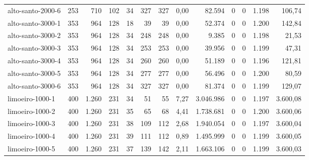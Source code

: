 \begin{table}[ht!]
{\begin{tabular}{lrrrrrrrrrrrr}
			\rowcolor{rowgrey}alto-santo-2000-6                                                       & 253   & 710   & 102 & 34 & 327 & 327 & 0,00  & 82.594    & 0 & 0 & 1.198 & 106,74   \\
			\rowcolor{rowgrey}alto-santo-3000-1                                                       & 353   & 964   & 128 & 18 & 39  & 39  & 0,00  & 52.374    & 0 & 0 & 1.200 & 142,84   \\
			\rowcolor{rowgrey}alto-santo-3000-2                                                       & 353   & 964   & 128 & 34 & 248 & 248 & 0,00  & 9.385     & 0 & 0 & 1.198 & 21,53    \\
			\rowcolor{rowgrey}alto-santo-3000-3                                                       & 353   & 964   & 128 & 34 & 253 & 253 & 0,00  & 39.956    & 0 & 0 & 1.199 & 47,31    \\
			\rowcolor{rowgrey}alto-santo-3000-4                                                       & 353   & 964   & 128 & 34 & 260 & 260 & 0,00  & 51.189    & 0 & 0 & 1.196 & 121,81   \\
			\rowcolor{rowgrey}alto-santo-3000-5                                                       & 353   & 964   & 128 & 34 & 277 & 277 & 0,00  & 56.496    & 0 & 0 & 1.200 & 80,59    \\
			\rowcolor{rowgrey}alto-santo-3000-6                                                       & 353   & 964   & 128 & 34 & 327 & 327 & 0,00  & 81.374    & 0 & 0 & 1.199 & 129,07   \\
			\midrule
			\rowcolor{rowlight}limoeiro-1000-1                                                        & 400   & 1.260 & 231 & 34 & 51  & 55  & 7,27  & 3.046.986 & 0 & 0 & 1.197 & 3.600,08 \\
			\rowcolor{rowlight}limoeiro-1000-2                                                        & 400   & 1.260 & 231 & 35 & 65  & 68  & 4,41  & 1.738.681 & 0 & 0 & 1.200 & 3.600,06 \\
			\rowcolor{rowlight}limoeiro-1000-3                                                        & 400   & 1.260 & 231 & 38 & 109 & 112 & 2,68  & 1.940.054 & 0 & 0 & 1.197 & 3.600,04 \\
			\rowcolor{rowlight}limoeiro-1000-4                                                        & 400   & 1.260 & 231 & 39 & 111 & 112 & 0,89  & 1.495.999 & 0 & 0 & 1.199 & 3.600,05 \\
			\rowcolor{rowlight}limoeiro-1000-5                                                        & 400   & 1.260 & 231 & 37 & 139 & 142 & 2,11  & 1.663.106 & 0 & 0 & 1.199 & 3.600,03 \\

\end{tabular}}
\end{table}
